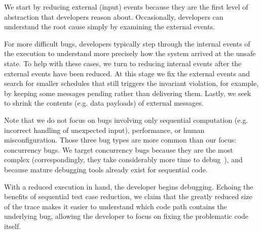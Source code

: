 We start by reducing external (input) events because they are the first level
of abstraction that developers reason about. Occasionally, developers can
understand the root cause simply by examining the external events.

For more difficult bugs, developers typically step through the internal events of
the execution to understand more precisely how the system arrived at the unsafe
state. To help with these cases, we turn to reducing internal events after
the external events have been reduced. At this stage we fix the external events and search for
smaller schedules that still triggers the invariant
violation, for example, by keeping some
messages pending rather than delivering them.
Lastly, we seek to shrink the contents (e.g. data payloads) of external messages.

Note that we do not focus on bugs involving only sequential computation (e.g.
incorrect handling of unexpected input), performance, or human
misconfiguration. Those three bug types
are more common than our focus: concurrency bugs.
We target concurrency bugs because they are the most complex (correspondingly, they take considerably more time to
debug~\cite{msoft_concurrency}), and because mature debugging tools already exist for sequential code.

With a reduced execution in hand, the developer begins debugging.
Echoing the benefits of sequential test case reduction, we claim that the greatly reduced size of the
trace makes it easier to understand which code path contains
the underlying bug, allowing the developer to focus on
fixing the problematic code itself.


